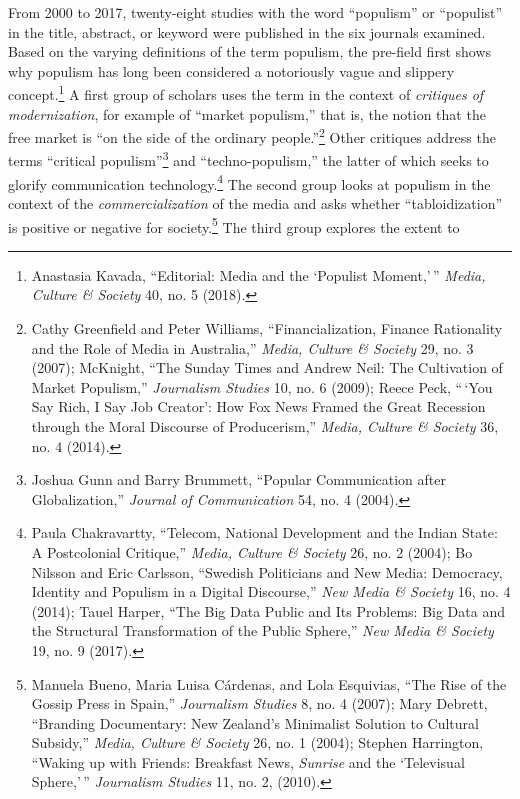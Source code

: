 \documentclass{tufte-handout}
\begin{document}
From 2000 to 2017, twenty-eight studies with the word ``populism'' or
``populist'' in the title, abstract, or keyword were published in the
six journals examined. Based on the varying definitions of the term
populism, the pre-field first shows why populism has long been
considered a notoriously vague and slippery concept.\footnote{Anastasia
  Kavada, ``Editorial: Media and the `Populist Moment,'\,'' \emph{Media,
  Culture \& Society} 40, no. 5 (2018).} A first group of scholars uses
the term in the context of \emph{critiques of modernization}, for
example of ``market populism,'' that is, the notion that the free market
is ``on the side of the ordinary people.''\footnote{Cathy Greenfield and
  Peter Williams, ``Financialization, Finance Rationality and the Role
  of Media in Australia,'' \emph{Media, Culture \& Society} 29, no. 3
  (2007); McKnight, ``The Sunday Times and Andrew Neil: The Cultivation
  of Market Populism,'' \emph{Journalism Studies} 10, no. 6 (2009);
  Reece Peck, ``\,`You Say Rich, I Say Job Creator': How Fox News Framed
  the Great Recession through the Moral Discourse of Producerism,''
  \emph{Media, Culture \& Society} 36, no. 4 (2014).} Other critiques
address the terms ``critical populism''\footnote{Joshua Gunn and Barry
  Brummett, ``Popular Communication after Globalization,'' \emph{Journal
  of Communication} 54, no. 4 (2004).} and ``techno-populism,'' the
latter of which seeks to glorify communication technology.\footnote{Paula
  Chakravartty, ``Telecom, National Development and the Indian State: A
  Postcolonial Critique,'' \emph{Media, Culture \& Society} 26, no. 2
  (2004); Bo Nilsson and Eric Carlsson, ``Swedish Politicians and New
  Media: Democracy, Identity and Populism in a Digital Discourse,''
  \emph{New Media \& Society} 16, no. 4 (2014); Tauel Harper, ``The Big
  Data Public and Its Problems: Big Data and the Structural
  Transformation of the Public Sphere,'' \emph{New Media \& Society} 19,
  no. 9 (2017).} The second group looks at populism in the context of
the \emph{commercialization} of the media and asks whether
``tabloidization'' is positive or negative for society.\footnote{Manuela
  Bueno, Maria Luisa Cárdenas, and Lola Esquivias, ``The Rise of the
  Gossip Press in Spain,'' \emph{Journalism Studies} 8, no. 4 (2007);
  Mary Debrett, ``Branding Documentary: New Zealand's Minimalist
  Solution to Cultural Subsidy,'' \emph{Media, Culture \& Society} 26,
  no. 1 (2004); Stephen Harrington, ``Waking up with Friends: Breakfast
  News, \emph{Sunrise} and the `Televisual Sphere,'\,'' \emph{Journalism
  Studies} 11, no. 2, (2010).} The third group explores the extent to
\end{document}
